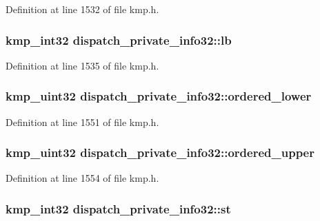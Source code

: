 Definition at line 1532 of file kmp.\-h.

\hypertarget{structdispatch__private__info32_aceda8da59ca95fb14f9b1f34815ea7f5}{
\subsubsection[{lb}]{\setlength{\rightskip}{0pt plus 5cm}kmp\-\_\-int32 dispatch\-\_\-private\-\_\-info32\-::lb}}\label{structdispatch__private__info32_aceda8da59ca95fb14f9b1f34815ea7f5}


Definition at line 1535 of file kmp.\-h.

\hypertarget{structdispatch__private__info32_ac0b2dc8bb1c33ff7e516a258dab4316a}{
\subsubsection[{ordered\-\_\-lower}]{\setlength{\rightskip}{0pt plus 5cm}kmp\-\_\-uint32 dispatch\-\_\-private\-\_\-info32\-::ordered\-\_\-lower}}\label{structdispatch__private__info32_ac0b2dc8bb1c33ff7e516a258dab4316a}


Definition at line 1551 of file kmp.\-h.

\hypertarget{structdispatch__private__info32_afc1a1143b8cbe39b41ed6420e0f0e0ef}{
\subsubsection[{ordered\-\_\-upper}]{\setlength{\rightskip}{0pt plus 5cm}kmp\-\_\-uint32 dispatch\-\_\-private\-\_\-info32\-::ordered\-\_\-upper}}\label{structdispatch__private__info32_afc1a1143b8cbe39b41ed6420e0f0e0ef}


Definition at line 1554 of file kmp.\-h.

\hypertarget{structdispatch__private__info32_a84a2005ae95339dee87541a39ea4d0ab}{
\subsubsection[{st}]{\setlength{\rightskip}{0pt plus 5cm}kmp\-\_\-int32 dispatch\-\_\-private\-\_\-info32\-::st}}\label{structdispatch__private__info32_a84a2005ae95339dee87541a39ea4d0ab}



